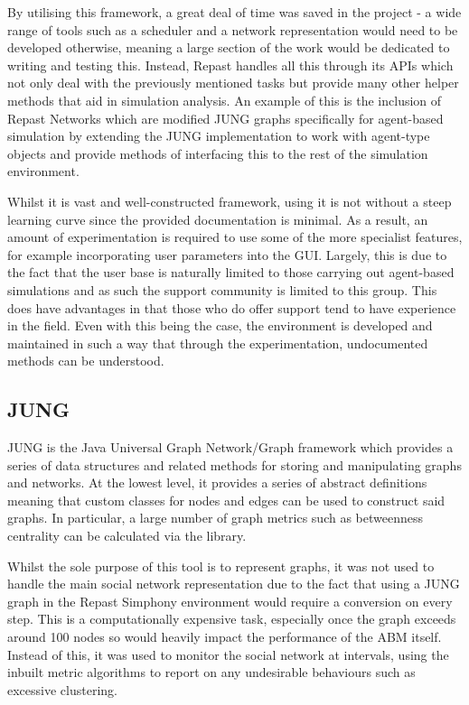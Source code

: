\documentclass[]{report}
\begin{document}
By utilising this framework, a great deal of time was saved in the project - a wide range of tools such as a scheduler and a network representation would need to be developed otherwise, meaning a large section of the work would be dedicated to writing and testing this. Instead, Repast handles all this through its APIs which not only deal with the previously mentioned tasks but provide many other helper methods that aid in simulation analysis. An example of this is the inclusion of Repast Networks which are modified JUNG graphs specifically for agent-based simulation by extending the JUNG implementation to work with agent-type objects and provide methods of interfacing this to the rest of the simulation environment.

Whilst it is vast and well-constructed framework, using it is not without a steep learning curve since the provided documentation is minimal. As a result, an amount of experimentation is required to use some of the more specialist features, for example incorporating user parameters into the GUI. Largely, this is due to the fact that the user base is naturally limited to those carrying out agent-based simulations and as such the support community is limited to this group. This does have advantages in that those who do offer support tend to have experience in the field. Even with this being the case, the environment is developed and maintained in such a way that through the experimentation, undocumented methods can be understood.

\subsection{JUNG}
JUNG is the Java Universal Graph Network/Graph framework which provides a series of data structures and related methods for storing and manipulating graphs and networks. At the lowest level, it provides a series of abstract definitions meaning that custom classes for nodes and edges can be used to construct said graphs. In particular, a large number of graph metrics such as betweenness centrality can be calculated via the library.

Whilst the sole purpose of this tool is to represent graphs, it was not used to handle the main social network representation due to the fact that using a JUNG graph in the Repast Simphony environment would require a conversion on every step. This is a computationally expensive task, especially once the graph exceeds around 100 nodes so would heavily impact the performance of the ABM itself. Instead of this, it was used to monitor the social network at intervals, using the inbuilt metric algorithms to report on any undesirable behaviours such as excessive clustering.
\end{document}
